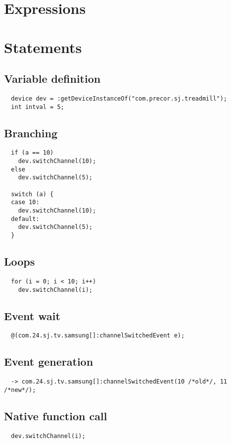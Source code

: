 \documentclass{myproc}
\begin{document}
\section{Expressions}

\section{Statements}
\subsection{Variable definition}
\begin{verbatim}
  device dev = :getDeviceInstanceOf("com.precor.sj.treadmill");
  int intval = 5;
\end{verbatim}

\subsection{Branching}
\begin{verbatim}
  if (a == 10)
    dev.switchChannel(10);
  else
    dev.switchChannel(5);

  switch (a) {
  case 10: 
    dev.switchChannel(10);
  default: 
    dev.switchChannel(5);
  }
\end{verbatim}

\subsection{Loops}
\begin{verbatim}
  for (i = 0; i < 10; i++)
    dev.switchChannel(i);    
\end{verbatim}

\subsection{Event wait}
\begin{verbatim}
  @(com.24.sj.tv.samsung[]:channelSwitchedEvent e);
\end{verbatim}

\subsection{Event generation}
\begin{verbatim}
  -> com.24.sj.tv.samsung[]:channelSwitchedEvent(10 /*old*/, 11 /*new*/);
\end{verbatim}

\subsection{Native function call}
\begin{verbatim}
  dev.switchChannel(i);    
\end{verbatim}
\end{document}
